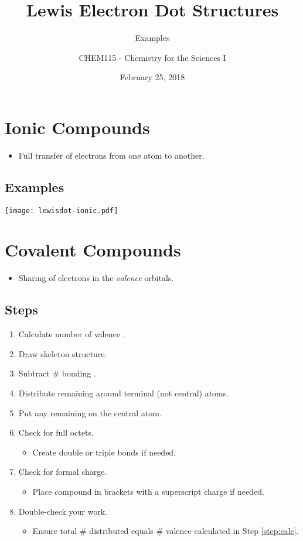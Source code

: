 \documentclass[11pt,letterpaper]{article}
\title{Lewis Electron Dot Structures}
\subtitle{Examples}
\institute[CHEM115 Bloomsburg University]{CHEM115 --- Chemistry for the Sciences I \\ Bloomsburg University}
\author{CHEM115 - Chemistry for the Sciences I}
\date{February 25, 2018}
\begin{document}
\section{Ionic Compounds}

\begin{itemize}
	\item Full transfer of electrons from one atom to another.
\end{itemize}

\subsection{Examples}
\begin{center}
	\texttt{[image: lewisdot-ionic.pdf]}
\end{center}

\section{Covalent Compounds}

\begin{itemize}
	\item Sharing of electrons in the \emph{valence} orbitals.
\end{itemize}

\subsection{Steps}
\begin{enumerate}
	\item \label{step:calc} Calculate number of valence \el{}.
	\item Draw skeleton structure.
	\item Subtract \# bonding \el{}.
	\item Distribute remaining \el{} around terminal (not central) atoms.
	\item Put any remaining \el{} on the central atom.
	\item Check for full octets.
		\begin{itemize}
			\item Create double or triple bonds if needed.
		\end{itemize}
	\item Check for formal charge.
		\begin{itemize}
			\item Place compound in brackets with a superscript
				charge if needed.
		\end{itemize}
	\item Double-check your work.
		\begin{itemize}
			\item Ensure total \# \el{} distributed equals \#
				valence \el{} calculated in Step
				\ref{step:calc}.
		\end{itemize}
\end{enumerate}
\end{document}
